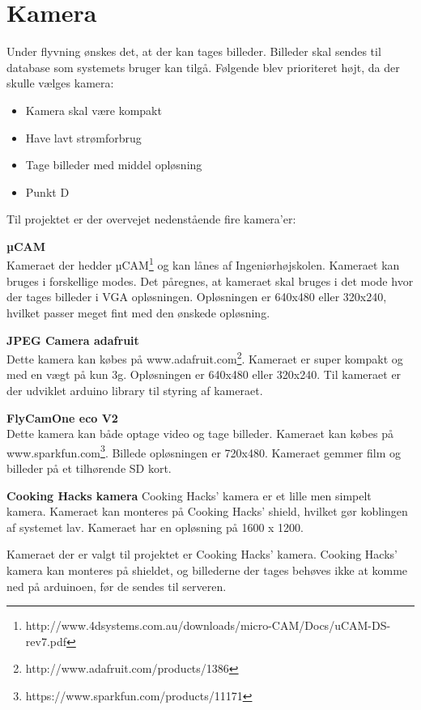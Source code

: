 \section{Kamera}

Under flyvning ønskes det, at der kan tages billeder. Billeder skal sendes til database som systemets bruger kan tilgå. Følgende blev prioriteret højt, da der skulle vælges kamera: 

\begin{itemize}
	\item Kamera skal være kompakt
	\item Have lavt strømforbrug
	\item Tage billeder med middel opløsning
	\item Punkt D
\end{itemize}

Til projektet er der overvejet nedenstående fire kamera'er:

\textbf{µCAM} \\
Kameraet der hedder µCAM\footnote{http://www.4dsystems.com.au/downloads/micro-CAM/Docs/uCAM-DS-rev7.pdf} og kan lånes af Ingeniørhøjskolen. Kameraet kan bruges i forskellige modes. Det påregnes, at kameraet skal bruges i det mode hvor der tages billeder i VGA opløsningen. Opløsningen er 640x480 eller 320x240, hvilket passer meget fint med den ønskede opløsning.

\textbf{JPEG Camera adafruit} \\
Dette kamera kan købes på www.adafruit.com\footnote{http://www.adafruit.com/products/1386}. Kameraet er super kompakt og med en vægt på kun 3g. Opløsningen er  640x480 eller 320x240. Til kameraet er der udviklet arduino library til styring af kameraet.

\textbf{FlyCamOne eco V2} \\
Dette kamera kan både optage video og tage billeder. Kameraet kan købes på www.sparkfun.com\footnote{https://www.sparkfun.com/products/11171}. Billede opløsningen er 720x480. Kameraet gemmer film og billeder på et tilhørende SD kort. 

\textbf{Cooking Hacks kamera}
Cooking Hacks' kamera er et lille men simpelt kamera. Kameraet kan monteres på Cooking Hacks' shield, hvilket gør koblingen af systemet lav. Kameraet har en opløsning på 1600 x 1200.

Kameraet der er valgt til projektet er Cooking Hacks' kamera. Cooking Hacks' kamera kan monteres på shieldet, og billederne der tages behøves ikke at komme ned på arduinoen, før de sendes til serveren.




